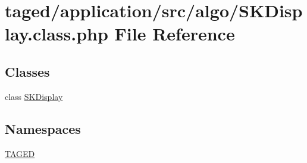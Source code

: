 \hypertarget{_s_k_display_8class_8php}{}\section{taged/application/src/algo/\+S\+K\+Display.class.\+php File Reference}
\label{_s_k_display_8class_8php}
\subsection*{Classes}
\begin{DoxyCompactItemize}
\item 
class \hyperlink{class_s_k_display}{S\+K\+Display}
\end{DoxyCompactItemize}
\subsection*{Namespaces}
\begin{DoxyCompactItemize}
\item 
 \hyperlink{namespace_t_a_g_e_d}{T\+A\+G\+ED}
\end{DoxyCompactItemize}
